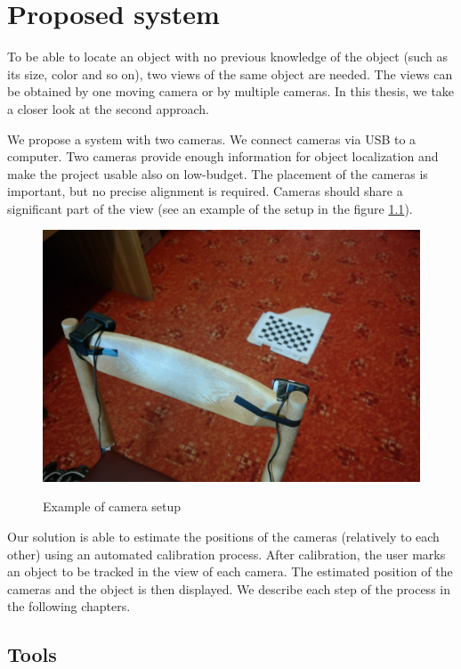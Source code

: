 \chapter{Proposed system}

To be able to locate an object with no previous knowledge of the object (such
as its size, color and so on), two views of the same object are needed. The
views can be obtained by one moving camera or by multiple cameras. In this
thesis, we take a closer look at the second approach.

We propose a system with two cameras. We connect cameras via USB to a computer.
Two cameras provide enough information for object localization and make the
project usable also on low-budget. The placement of the cameras is important,
but no precise alignment is required. Cameras should share a significant part
of the view (see an example of the setup in the figure \ref{fig:camera-setup}).

\begin{figure}
	\includegraphics[width=\linewidth]{img/camera-positions.jpg}
	\label{fig:camera-setup}
	\caption{Example of camera setup}
\end{figure}

Our solution is able to estimate the positions of the cameras (relatively to
each other) using an automated calibration process. After calibration, the user
marks an object to be tracked in the view of each camera. The estimated
position of the cameras and the object is then displayed. We describe each step
of the process in the following chapters.

\section{Tools}

